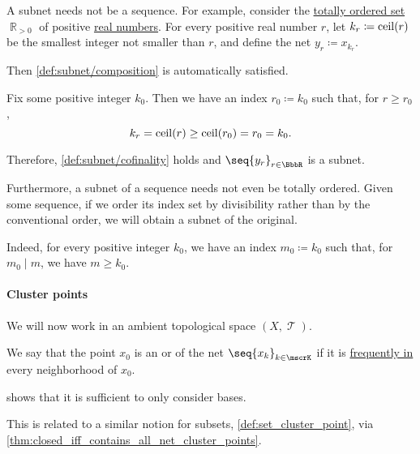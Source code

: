 \begin{example}
\begin{thmenum}
    A subnet needs not be a sequence. For example, consider the \hyperref[def:totally_ordered_set]{totally ordered set} \( \BbbR_{>0} \) of positive \hyperref[def:real_numbers]{real numbers}. For every positive real number \( r \), let \( k_r \coloneqq \operatorname{ceil}(r) \) be the smallest integer not smaller than \( r \), and define the net \( y_r \coloneqq x_{k_r} \).

    Then \ref{def:subnet/composition} is automatically satisfied.

    Fix some positive integer \( k_0 \). Then we have an index \( r_0 \coloneqq k_0 \) such that, for \( r \geq r_0 \),
    \begin{equation*}
      k_r = \operatorname{ceil}(r) \geq \operatorname{ceil}(r_0) = r_0 = k_0.
    \end{equation*}

    Therefore, \ref{def:subnet/cofinality} holds and \( \seq{ y_r }_{r \in \BbbR} \) is a subnet.

     Furthermore, a subnet of a sequence needs not even be totally ordered. Given some sequence, if we order its index set by divisibility rather than by the conventional order, we will obtain a subnet of the original.

    Indeed, for every positive integer \( k_0 \), we have an index \( m_0 \coloneqq k_0 \) such that, for \( m_0 \mid m \), we have \( m \geq k_0 \).
  \end{thmenum}
\end{example}

\paragraph{Cluster points}

We will now work in an ambient topological space \( (X, \mscrT) \).

\begin{definition}\label{def:net_cluster_point}
  We say that the point \( x_0 \) is an  or  of the net \( \seq{ x_k }_{k \in \mscrK} \) if it is \hyperref[def:net_frequently_in]{frequently in} every neighborhood of \( x_0 \).
\end{definition}
\begin{comments}
  \item {} shows that it is sufficient to only consider bases.
  \item This is related to a similar notion for subsets, \cref{def:set_cluster_point}, via \cref{thm:closed_iff_contains_all_net_cluster_points}.
\end{comments}

